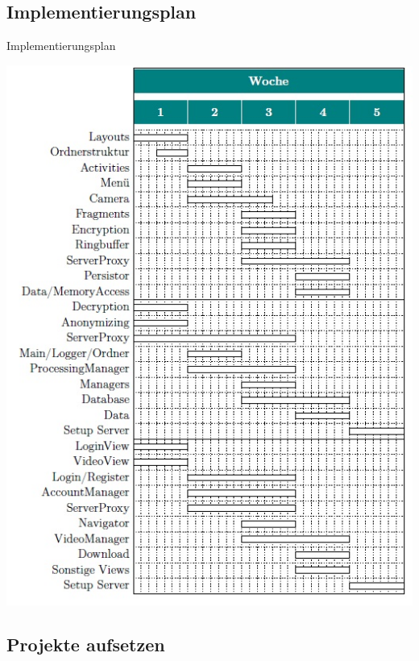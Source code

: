 \documentclass[19pt]{beamer}
\begin{document}
\subsection{Implementierungsplan}

\begin{frame}{Implementierungsplan}
	\begin{center}
		\includegraphics[scale=0.4]{resources/ImpPlanPre.jpg}
	\end{center}
\end{frame}

\subsection{Projekte aufsetzen}
\end{document}
